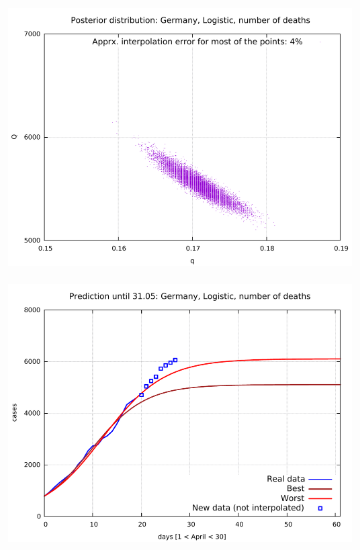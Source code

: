 \documentclass[8pt]{article}
\begin{document}
\begin{figure}[h!]
  \centering
  \begin{subfigure}[b]{0.5\linewidth}
  \includegraphics[width=\linewidth]{../de_l_d/posterior.pdf}
  \end{subfigure}  
	\begin{subfigure}[b]{0.48\linewidth}
    \includegraphics[width=\linewidth]{../de_l_d/prediction.pdf}
  \end{subfigure}
  \begin{subfigure}[b]{0.48\linewidth}

\end{subfigure}
\end{figure}
\end{document}

